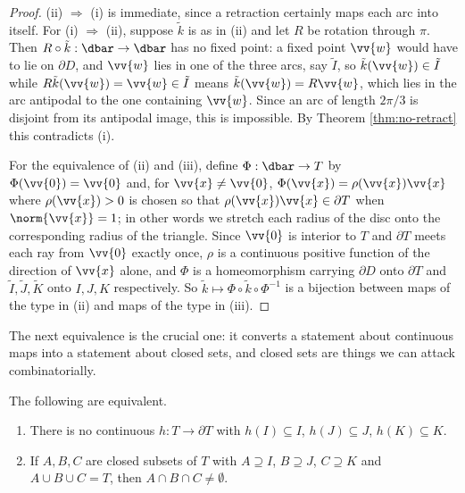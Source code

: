\begin{proof}
	(ii) $\Rightarrow$ (i) is immediate, since a retraction certainly maps each arc into itself. For (i) $\Rightarrow$ (ii), suppose $\tilde k$ is as in (ii) and let $R$ be rotation through $\pi$. Then $R\circ \tilde k : \dbar \to \dbar$ has no fixed point: a fixed point $\vv{w}$ would have to lie on $\partial D$, and $\vv{w}$ lies in one of the three arcs, say $\tilde I$, so $\tilde k(\vv{w}) \in \tilde I$ while $R\tilde k(\vv{w}) = \vv{w} \in \tilde I$ means $\tilde k (\vv{w}) = R\vv{w}$, which lies in the arc antipodal to the one containing $\vv{w}$. Since an arc of length $2\pi/3$ is disjoint from its antipodal image, this is impossible. By Theorem \ref{thm:no-retract} this contradicts (i).

	For the equivalence of (ii) and (iii), define $\Phi : \dbar \to T$ by $\Phi(\vv{0}) = \vv{0}$ and, for $\vv{x} \neq \vv{0}$, $\Phi(\vv{x}) = \rho(\vv{x})\vv{x}$ where $\rho(\vv{x})>0$ is chosen so that $\rho(\vv{x})\vv{x} \in \partial T$ when $\norm{\vv{x}}=1$; in other words we stretch each radius of the disc onto the corresponding radius of the triangle. Since $\vv{0}$ is interior to $T$ and $\partial T$ meets each ray from $\vv{0}$ exactly once, $\rho$ is a continuous positive function of the direction of $\vv{x}$ alone, and $\Phi$ is a homeomorphism carrying $\partial D$ onto $\partial T$ and $\tilde I, \tilde J,\tilde K$ onto $I, J, K$ respectively. So $\tilde k \mapsto \Phi\circ\tilde k\circ\Phi^{-1}$ is a bijection between maps of the type in (ii) and maps of the type in (iii).
\end{proof}

The next equivalence is the crucial one: it converts a statement about continuous maps into a statement about closed sets, and closed sets are things we can attack combinatorially.

\begin{lemma}\label{lem:three-colours}
	The following are equivalent.
	\begin{enumerate}[label=(\roman*)]
		\item There is no continuous $h : T \to \partial T$ with $h(I)\subseteq I$, $h(J)\subseteq J$, $h(K)\subseteq K$.
		\item If $A, B, C$ are closed subsets of $T$ with $A \supseteq I$, $B\supseteq J$, $C \supseteq K$ and $A\cup B\cup C = T$, then $A \cap B \cap C \neq \emptyset$.
	\end{enumerate}
\end{lemma}

